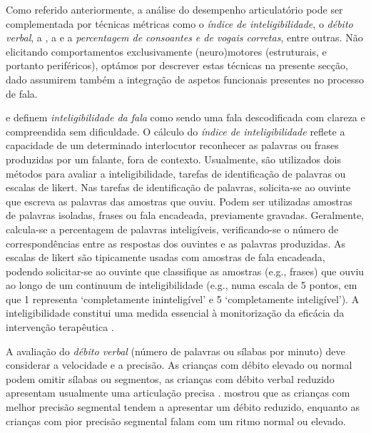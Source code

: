 \documentclass[output=paper]{LSP/langsci}
\begin{document}
Como referido anteriormente, a análise do desempenho articulatório pode ser complementada por técnicas métricas como o \textit{índice de inteligibilidade}, o \textit{débito verbal}, a \textit{}, a \textit{} e a \textit{percentagem de consoantes e de vogais corretas}, entre outras. Não elicitando comportamentos exclusivamente (neuro)motores (estruturais, e portanto periféricos), optámos por descrever estas técnicas na presente secção, dado assumirem também a integração de aspetos funcionais presentes no processo de fala. 

\citet{miller2013} e \citet{pascoe_etal2006} definem \textit{inteligibilidade da fala} como sendo uma fala descodificada com clareza e compreendida sem dificuldade. O cálculo do \textit{índice de inteligibilidade} reflete a capacidade de um determinado interlocutor reconhecer as palavras ou frases produzidas por um falante, fora de contexto. Usualmente, são utilizados dois métodos para avaliar a inteligibilidade, tarefas de identificação de palavras ou escalas de likert. Nas tarefas de identificação de palavras, solicita-se ao ouvinte que escreva as palavras das amostras que ouviu. Podem ser utilizadas amostras de palavras isoladas, frases ou fala encadeada, previamente gravadas. Geralmente, calcula-se a percentagem de palavras inteligíveis, verificando-se o número de correspondências entre as respostas dos ouvintes e as palavras produzidas. As escalas de likert são tipicamente usadas com amostras de fala encadeada, podendo solicitar-se ao ouvinte que classifique as amostras (e.g., frases) que ouviu ao longo de um continuum de inteligibilidade (e.g., numa escala de 5 pontos, em que 1 representa ‘completamente ininteligível’ e 5 ‘completamente inteligível’). A inteligibilidade constitui uma medida essencial à monitorização da eficácia da intervenção terapêutica \citep{lousada_etal2014}.

A avaliação do \textit{débito verbal} (número de palavras ou sílabas por minuto) deve considerar a velocidade e a precisão. As crianças com débito elevado ou normal podem omitir sílabas ou segmentos, as crianças com débito verbal reduzido apresentam usualmente uma articulação precisa \citep{bowen2015}. \citet{skinder2000} mostrou que as crianças com melhor precisão segmental tendem a apresentar um débito reduzido, enquanto as crianças com pior precisão segmental falam com um ritmo normal ou elevado. 
\end{document}
